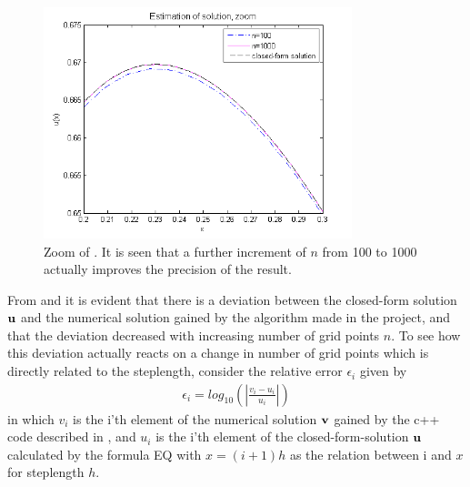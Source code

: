 \begin{figure}[H]
	\centering
	\includegraphics[width=0.8\textwidth]{Figures/estimaition_of_solution_zoom.png}
	\caption{Zoom of . It is seen that a further increment of $n$ from 100 to 1000 actually improves the precision of the result.}
	\label{fig:IntOfResult2}
\end{figure}

From  and  it is evident that there is a deviation between the closed-form solution $\mbox{\textbf{u}}$ and the numerical solution gained by the algorithm made in the project, and that the deviation decreased with increasing number of grid points $n$.
To see how this deviation actually reacts on a change in number of grid points which is directly related to the steplength, consider the relative error $\epsilon_i$ given by
\begin{align}
	\epsilon_i=log_{10}\left(\left|\frac{v_i-u_i}
                 {u_i}\right|\right)
    \label{eq:IntOfResult1}
\end{align}
in which $v_i$ is the i'th element of the numerical solution $\mbox{\textbf{v}}$ gained by the c++ code described in , and $u_i$ is the i'th element of the closed-form-solution $\mbox{\textbf{u}}$ calculated by the formula EQ with $x=(i+1)h$ as the relation between i and $x$ for steplength $h$.  

